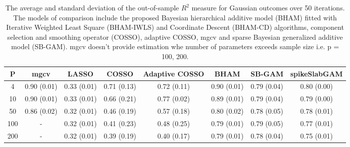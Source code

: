 \begin{table}[ht]
\centering
\begin{tabular}{cccccccc}
  \hline
P & mgcv & LASSO & COSSO & Adaptive COSSO & BHAM & SB-GAM & spikeSlabGAM \\ 
  \hline
  4 & 0.90 (0.01) & 0.33 (0.01) & 0.71 (0.13) & 0.72 (0.11) & 0.90 (0.01) & 0.79 (0.04) & 0.80 (0.00) \\ 
   10 & 0.90 (0.01) & 0.33 (0.01) & 0.66 (0.21) & 0.77 (0.02) & 0.89 (0.01) & 0.79 (0.04) & 0.79 (0.00) \\ 
   50 & 0.86 (0.02) & 0.32 (0.01) & 0.46 (0.19) & 0.57 (0.18) & 0.80 (0.02) & 0.78 (0.05) & 0.78 (0.01) \\ 
  100 & - & 0.32 (0.01) & 0.41 (0.23) & 0.48 (0.25) & 0.79 (0.01) & 0.79 (0.05) & 0.77 (0.01) \\ 
  200 & - & 0.32 (0.01) & 0.39 (0.19) & 0.40 (0.17) & 0.79 (0.01) & 0.78 (0.04) & 0.75 (0.01) \\ 
   \hline
\end{tabular}
\caption{The average and standard deviation of the out-of-sample $R^2$ measure for
    Gaussian outcomes over 50 iterations. The models of comparison include the proposed Bayesian
    hierarchical additive model (BHAM) fitted with Iterative Weighted Least Square (BHAM-IWLS) and
    Coordinate Descent (BHAM-CD) algorithms, component selection and smoothing operator (COSSO), adaptive
    COSSO, mgcv and sparse Bayesian generalized additive model (SB-GAM). mgcv doesn't provide estimation
    whe number of parameters exceeds sample size i.e. p = 100, 200.} 
\label{tab:gaus}
\end{table}

